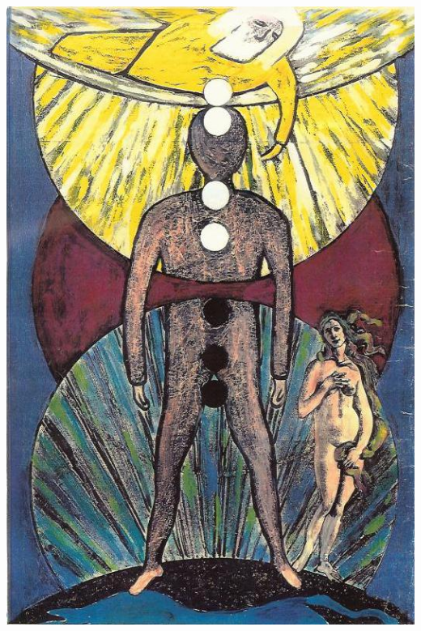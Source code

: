 \documentclass[landscape,twocolumn,letterpaper]{article}
\begin{document}
\clearpage%
\includegraphics[height=1.1\textheight,bb= 0 0 527 798]{./back.jpg}
\clearpage%
\end{document}
